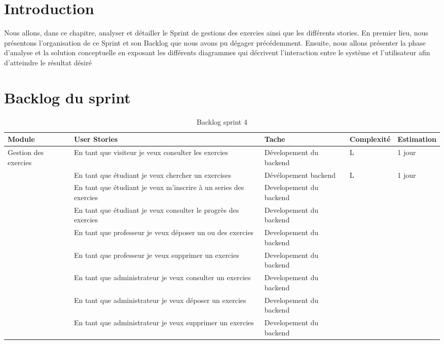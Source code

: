 \section{Introduction}
Nous allons, dans ce chapitre, analyser et détailler le Sprint de gestions des exercies ainsi que les différents stories. 
En premier lieu, nous présentons l’organisation de ce Sprint et son Backlog que nous avons pu dégager précédemment.
Ensuite, nous allons présenter la phase d’analyse et la solution conceptuelle en exposant les différents diagrammes qui décrivent l’interaction entre le système et l’utilisateur afin d’atteindre le résultat désiré



\section{Backlog du sprint}
\begin{table*}[h]
    \begin{center} 
    \begin{tabular}{|p{2.5cm}|p{6cm}|p{2.8cm}|p{1.8cm}|p{1.8cm}|} \hline 
Module &  User Stories &  Tache &  Complexité & Estimation \\ \hline

Gestion des exercies & En tant que visiteur je veux consulter les exercies & Dévelopement du backend & \centering L & 1 jour  \\  \hline
& En tant que étudiant je veux chercher un exercises & Dévélopement backend & \centering L & 1 jour  \\ 
& En tant que étudiant je veux m’inscrire à un series des exercies & Developement du backend & &\\ \hline
& En tant que étudiant je veux consulter le progrès des exercies & Developement du backend & & \\ \hline
& En tant que professeur je veux déposer un ou des exercies  & Developement du backend & & \\ \hline
&  En tant que professeur je veux supprimer un exercies & Developement du backend & & \\ \hline
& En tant que administrateur je veux consulter un exercies & Developement du backend & & \\ \hline
&  En tant que administrateur je veux déposer un exercies & Developement du backend & & \\ \hline
& En tant que administrateur je veux supprimer un exercies & Developement du backend & & \\ \hline
\end{tabular}
\end{center}
\center
\caption { Backlog sprint 4}
\label{tab:bert_res}
\end{table*} 







